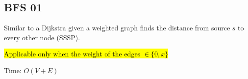 \subsection{BFS 01}

Similar to a Dijkstra given a weighted graph finds the distance from source $s$ to every other node (SSSP).

\hl{Applicable only when the weight of the edges $\in \{0, x\}$}

Time: $O(V + E)$

